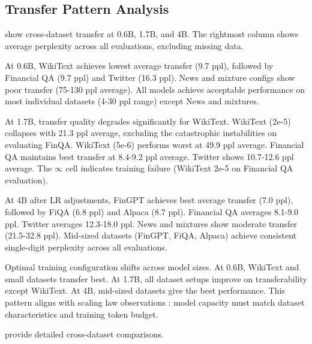 \subsection{Transfer Pattern Analysis}

 show cross-dataset transfer at 0.6B, 1.7B, and 4B. The rightmost column shows average perplexity across all evaluations, excluding missing data.

At 0.6B, WikiText achieves lowest average transfer (9.7 ppl), followed by Financial QA (9.7 ppl) and Twitter (16.3 ppl). News and mixture configs show poor transfer (75-130 ppl average). All models achieve acceptable performance on most individual datasets (4-30 ppl range) except News and mixtures.

At 1.7B, transfer quality degrades significantly for WikiText. WikiText (2e-5) collapses with 21.3 ppl average, excluding the catastrophic instabilities on evaluating FinQA. WikiText (5e-6) performs worst at 49.9 ppl average. Financial QA maintains best transfer at 8.4-9.2 ppl average. Twitter shows 10.7-12.6 ppl average. The $\infty$ cell indicates training failure (WikiText 2e-5 on Financial QA evaluation).

At 4B after LR adjustments, FinGPT achieves best average transfer (7.0 ppl), followed by FiQA (6.8 ppl) and Alpaca (8.7 ppl). Financial QA averages 8.1-9.0 ppl. Twitter averages 12.3-18.0 ppl. News and mixtures show moderate transfer (21.5-32.8 ppl). Mid-sized datasets (FinGPT, FiQA, Alpaca) achieve consistent single-digit perplexity across all evaluations.

Optimal training configuration shifts across model sizes. At 0.6B, WikiText and small datasets transfer best. At 1.7B, all dataset setups improve on transferability except WikiText. At 4B, mid-sized datasets give the best performance. This pattern aligns with scaling law observations \parencite{kaplan2020scaling,hoffmann2022training}: model capacity must match dataset characteristics and training token budget.

 provide detailed cross-dataset comparisons.

